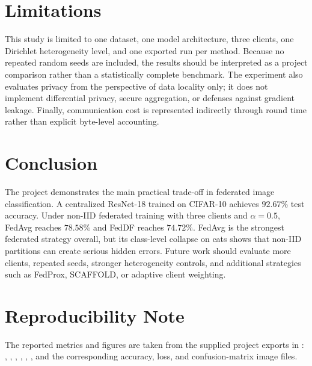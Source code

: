 \documentclass[11pt]{article}
\begin{document}
\section{Limitations}

This study is limited to one dataset, one model architecture, three clients, one Dirichlet heterogeneity level, and one exported run per method. Because no repeated random seeds are included, the results should be interpreted as a project comparison rather than a statistically complete benchmark. The experiment also evaluates privacy from the perspective of data locality only; it does not implement differential privacy, secure aggregation, or defenses against gradient leakage. Finally, communication cost is represented indirectly through round time rather than explicit byte-level accounting.

\section{Conclusion}

The project demonstrates the main practical trade-off in federated image classification. A centralized ResNet-18 trained on CIFAR-10 achieves $92.67\%$ test accuracy. Under non-IID federated training with three clients and $\alpha=0.5$, FedAvg reaches $78.58\%$ and FedDF reaches $74.72\%$. FedAvg is the strongest federated strategy overall, but its class-level collapse on cats shows that non-IID partitions can create serious hidden errors. Future work should evaluate more clients, repeated seeds, stronger heterogeneity controls, and additional strategies such as FedProx, SCAFFOLD, or adaptive client weighting.

\section*{Reproducibility Note}

The reported metrics and figures are taken from the supplied project exports in : , , , , , , and the corresponding accuracy, loss, and confusion-matrix image files.
\end{document}
